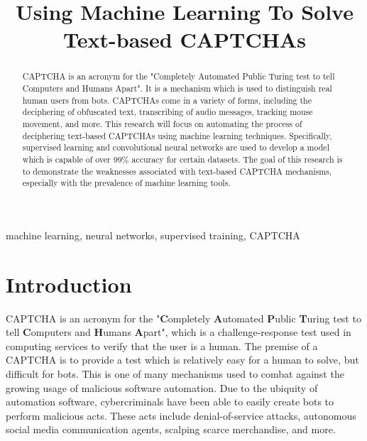\documentclass[11pt,conference]{IEEEtran}
\begin{document}
\title{Using Machine Learning To Solve Text-based CAPTCHAs\\
}

\author{
}

\maketitle

\begin{abstract}
	CAPTCHA is an acronym for the "Completely Automated Public Turing test
	to tell Computers and Humans Apart". It is a mechanism which is used to
	distinguish real human users from bots. CAPTCHAs come in a variety of forms,
	including the deciphering of obfuscated text, transcribing of audio messages,
	tracking mouse movement, and more. This research will focus on automating the
	process of deciphering text-based CAPTCHAs using machine learning
	techniques. Specifically, supervised learning and convolutional neural
	networks are used to develop
	a model which is capable of over 99\% accuracy for certain datasets. 
	The goal of this research is to demonstrate the weaknesses associated with text-based
	CAPTCHA mechanisms, especially with the prevalence of machine learning
	tools.
\end{abstract}

\begin{IEEEkeywords}
	machine learning, neural networks, supervised training, CAPTCHA
\end{IEEEkeywords}

\section{Introduction}
CAPTCHA is an acronym for the "\textbf{C}ompletely \textbf{A}utomated
\textbf{P}ublic \textbf{T}uring test to tell
\textbf{C}omputers and \textbf{H}umans \textbf{A}part", which is a
challenge-response test used in computing services to verify that the user is a
human. The premise of a CAPTCHA is to provide a test which is relatively easy
for a human to solve, but difficult for bots. This is one of many 
mechanisms used to combat against the growing usage of malicious software
automation. Due to the ubiquity of automation software, cybercriminals have
been able to easily create bots to perform malicious acts. These acts include
denial-of-service attacks, autonomous social media communication agents,
scalping scarce merchandise, and more.
\end{document}
